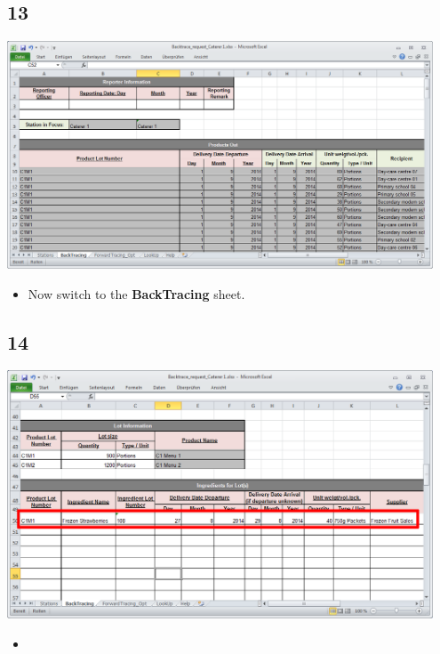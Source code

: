 \documentclass{beamer}
\begin{document}
\subsection{13}
\begin{frame}
	\begin{center}
  		\includegraphics[width=0.95\textwidth]{13.png}
	\end{center}
	\begin{itemize}
		\item Now switch to the \textbf{BackTracing} sheet.
		
	\end{itemize}
\end{frame}

\subsection{14}
\begin{frame}
	\begin{center}
  		\includegraphics[width=0.95\textwidth]{14.png}
	\end{center}
	\begin{itemize}
		\item
	\end{itemize}
\end{frame}
\end{document}
